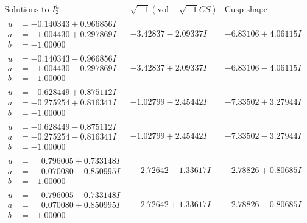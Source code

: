 \documentclass[1p]{elsarticle_modified}
\theoremstyle{definition}
\newcommand{\I}{\sqrt{-1}}
\begin{document}
$$\begin{array}{c|c|c}  
\text{Solutions to }I^u_{2}& \I (\text{vol} + \sqrt{-1}CS) & \text{Cusp shape}\\
 \hline 
\begin{aligned}
u &= -0.140343 + 0.966856 I \\
a &= -1.004430 + 0.297869 I \\
b &= -1.00000\phantom{ +0.000000I}\end{aligned}
 & -3.42837 - 2.09337 I & -6.83106 + 4.06115 I \\ \hline\begin{aligned}
u &= -0.140343 - 0.966856 I \\
a &= -1.004430 - 0.297869 I \\
b &= -1.00000\phantom{ +0.000000I}\end{aligned}
 & -3.42837 + 2.09337 I & -6.83106 - 4.06115 I \\ \hline\begin{aligned}
u &= -0.628449 + 0.875112 I \\
a &= -0.275254 + 0.816341 I \\
b &= -1.00000\phantom{ +0.000000I}\end{aligned}
 & -1.02799 - 2.45442 I & -7.33502 + 3.27944 I \\ \hline\begin{aligned}
u &= -0.628449 - 0.875112 I \\
a &= -0.275254 - 0.816341 I \\
b &= -1.00000\phantom{ +0.000000I}\end{aligned}
 & -1.02799 + 2.45442 I & -7.33502 - 3.27944 I \\ \hline\begin{aligned}
u &= \phantom{-}0.796005 + 0.733148 I \\
a &= \phantom{-}0.070080 - 0.850995 I \\
b &= -1.00000\phantom{ +0.000000I}\end{aligned}
 & \phantom{-}2.72642 - 1.33617 I & -2.78826 + 0.80685 I \\ \hline\begin{aligned}
u &= \phantom{-}0.796005 - 0.733148 I \\
a &= \phantom{-}0.070080 + 0.850995 I \\
b &= -1.00000\phantom{ +0.000000I}\end{aligned}
 & \phantom{-}2.72642 + 1.33617 I & -2.78826 - 0.80685 I \\ \hline\begin{aligned}

\end{aligned}
\end{array}$$
\end{document}
